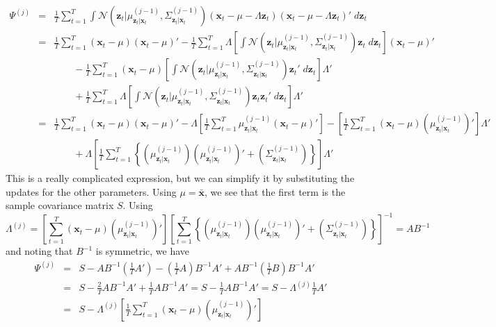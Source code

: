 \begin{eqnarray*}
	\Psi^{(j)} &=&\frac{1}{T}\sum_{t=1}^T \int  \mathcal{N}\left(\mathbf{z}_t|\mu^{(j-1)}_{\mathbf{z}_t|\mathbf{x}_t}, \Sigma^{(j-1)}_{\mathbf{z}_t|\mathbf{x}_t}\right)(\mathbf{x}_t - \mu -  \Lambda \textbf{z}_t)(\mathbf{x}_t - \mu -  \Lambda \textbf{z}_t)' \;d \textbf{z}_t\\
		&=&\frac{1}{T}\sum_{t=1}^T  (\mathbf{x}_t - \mu)(\mathbf{x}_t - \mu)' - \frac{1}{T}\sum_{t=1}^T \Lambda \left[\int  \mathcal{N}\left(\mathbf{z}_t|\mu^{(j-1)}_{\mathbf{z}_t|\mathbf{x}_t}, \Sigma^{(j-1)}_{\mathbf{z}_t|\mathbf{x}_t}\right) \mathbf{z}_t\;d \textbf{z}_t  \right](\mathbf{x}_t - \mu)'\\
		&& \quad \quad  - \frac{1}{T}\sum_{t=1}^T  (\mathbf{x}_t - \mu)\left[\int  \mathcal{N}\left(\mathbf{z}_t|\mu^{(j-1)}_{\mathbf{z}_t|\mathbf{x}_t}, \Sigma^{(j-1)}_{\mathbf{z}_t|\mathbf{x}_t}\right) \mathbf{z}_t'\;d \textbf{z}_t  \right]\Lambda'\\
		&& \quad \quad + \frac{1}{T}\sum_{t=1}^T \Lambda \left[\int  \mathcal{N}\left(\mathbf{z}_t|\mu^{(j-1)}_{\mathbf{z}_t|\mathbf{x}_t}, \Sigma^{(j-1)}_{\mathbf{z}_t|\mathbf{x}_t}\right) \mathbf{z}_t \mathbf{z}_t'\;d \textbf{z}_t\right] \Lambda'\\
		&=& \frac{1}{T}\sum_{t=1}^T  (\mathbf{x}_t - \mu)(\mathbf{x}_t - \mu)' -\Lambda \left[\frac{1}{T} \sum_{t=1}^T  \mu^{(j-1)}_{\mathbf{z}_t|\mathbf{x}_t} (\mathbf{x}_t - \mu)'\right] -  \left[\frac{1}{T} \sum_{t=1}^T (\mathbf{x}_t - \mu)\left(\mu^{(j-1)}_{\mathbf{z}_t|\mathbf{x}_t}\right)'\right]\Lambda' \\
			&& \quad \quad + \Lambda\left[\frac{1}{T} \sum_{t=1}^T  \left\{ \left(\mu^{(j-1)}_{\mathbf{z}_t|\mathbf{x}_t}\right)\left(\mu^{(j-1)}_{\mathbf{z}_t|\mathbf{x}_t}\right)' + \left(\Sigma^{(j-1)}_{\mathbf{z}_t|\mathbf{x}_t} \right)\right\} \right]\Lambda'
\end{eqnarray*}
This is a really complicated expression, but we can simplify it by substituting the updates for the other parameters. Using $\mu = \bar{\mathbf{x}}$, we see that the first term is the sample covariance matrix $S$. Using
$$\Lambda^{(j)} = \left[\sum_{t=1}^T (\mathbf{x}_t - \mu)\left(\mu^{(j-1)}_{\mathbf{z}_t|\mathbf{x}_t} \right)'\right]\left[\sum_{t=1}^T \left\{ \left(\mu^{(j-1)}_{\mathbf{z}_t|\mathbf{x}_t} \right)\left(\mu^{(j-1)}_{\mathbf{z}_t|\mathbf{x}_t} \right)' + \left(\Sigma^{(j-1)}_{\mathbf{z}_t|\mathbf{x}_t} \right) \right\}  \right]^{-1} = AB^{-1}$$
and noting that $B^{-1}$ is symmetric, we have
\begin{eqnarray*}
	\Psi^{(j)} &=& S - AB^{-1}\left(\frac{1}{T}A'\right) - \left(\frac{1}{T} A\right)B^{-1}A' + AB^{-1}\left(\frac{1}{T}B\right)B^{-1}A'\\
	&=&S - \frac{2}{T}AB^{-1}A' + \frac{1}{T}AB^{-1}A'= S - \frac{1}{T}AB^{-1}A' =  S - \Lambda^{(j)} \frac{1}{T}A'\\
	&=& S - \Lambda^{(j)}\left[\frac{1}{T} \sum_{t=1}^T (\mathbf{x}_t - \mu)\left(\mu^{(j-1)}_{\mathbf{z}_t|\mathbf{x}_t}\right)'\right]
\end{eqnarray*}
